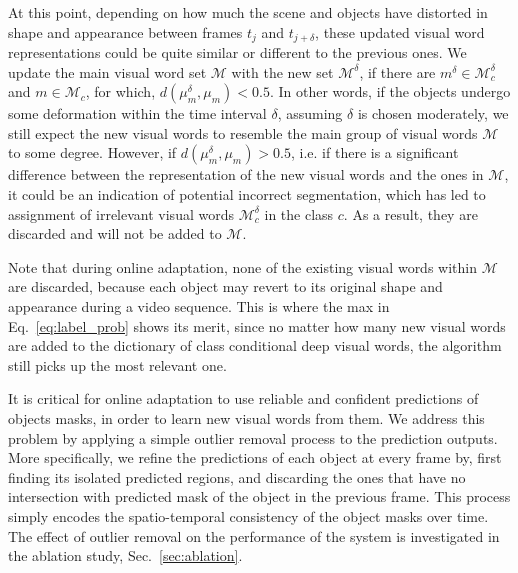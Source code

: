 \documentclass[10pt,twocolumn,letterpaper]{article}
\newcommand{\HB}[1]{{\color{blue}{HB: #1}}} %
\begin{document}
At this point, depending on how much the scene and objects have distorted in shape and appearance between frames $t_j$ and $t_{j+\delta}$, these updated visual word representations could be quite similar or different to the previous ones. We update the main visual word set $\mathcal{M}$ with the new set $\mathcal{M}^\delta$, if there are $m^\delta \in \mathcal{M}_c^\delta$ and $m \in \mathcal{M}_c$, for which, $d(\mu_{m}^\delta, \mu_m) < 0.5$. In other words, if the objects undergo some deformation within the time interval $\delta$, assuming $\delta$ is chosen moderately, we still expect the new visual words to resemble the main group of visual words $\mathcal{M}$ to some degree. However, if $d(\mu_{m}^\delta, \mu_m) > 0.5$, i.e. if there is a significant difference between the representation of the new visual words and the ones in $\mathcal{M}$, it could be an indication of potential incorrect segmentation, which has led to assignment of irrelevant visual words $\mathcal{M}_c^\delta$ in the class $c$. As a result, they are discarded and will not be added to $\mathcal{M}$.

Note that during online adaptation, none of the existing visual words within $\mathcal{M}$ are discarded, because each object may revert to its original shape and appearance during a video sequence. This is where the max in Eq.~\ref{eq:label_prob} shows its merit, since no matter how many new visual words are added to the dictionary of class conditional deep visual words, the algorithm still picks up the most relevant one.

It is critical for online adaptation to use reliable and confident predictions of objects masks, in order to learn new visual words from them.
We address this problem by applying a simple outlier removal process to the prediction outputs. More specifically, we refine the predictions of each object at every frame by, first finding its isolated predicted regions, and discarding the ones that have no intersection with predicted mask of the object in the previous frame. This process simply encodes the spatio-temporal consistency of the object masks over time. The effect of outlier removal on the performance of the system is investigated in the ablation study, Sec.~\ref{sec:ablation}. %
\end{document}
